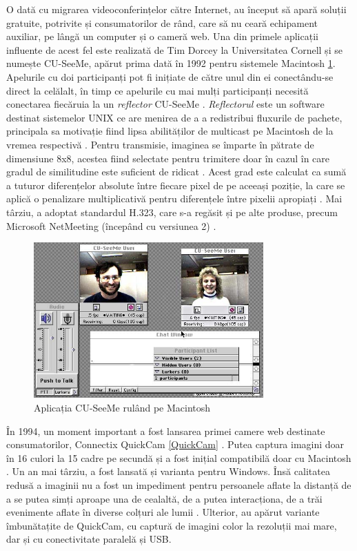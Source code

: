 \indent \par O dată cu migrarea videoconferințelor către Internet, au început să apară soluții gratuite, potrivite și consumatorilor de rând, care să nu ceară echipament auxiliar, pe lângă un computer și o cameră web. Una din primele aplicații influente de acest fel este realizată de Tim Dorcey la Universitatea Cornell și se numește CU-SeeMe, apărut prima dată în 1992 pentru sistemele Macintosh \ref{CUSeeMeMac}. Apelurile cu doi participanți pot fi inițiate de către unul din ei conectându-se direct la celălalt, în timp ce apelurile cu mai mulți participanți necesită conectarea fiecăruia la un \textit{reflector} CU-SeeMe \cite{Dorcey95}. \textit{Reflectorul} este un software destinat sistemelor UNIX ce are menirea de a a redistribui fluxurile de pachete, principala sa motivație fiind lipsa abilităților de multicast pe Macintosh de la vremea respectivă \cite{Dorcey95}. Pentru transmisie, imaginea se împarte în pătrate de dimensiune 8x8, acestea fiind selectate pentru trimitere doar în cazul în care gradul de similitudine este suficient de ridicat \cite{Dorcey95}. Acest grad este calculat ca sumă a tuturor diferențelor absolute între fiecare pixel de pe aceeași poziție, la care se aplică o penalizare multiplicativă pentru diferențele între pixelii apropiați \cite{Dorcey95}. Mai târziu, a adoptat standardul H.323, care s-a regăsit și pe alte produse, precum Microsoft NetMeeting (începând cu versiunea 2) \cite{Vidconf, Perey2000}.
\begin{figure}[H]
    \centering
    \includegraphics[width=8.8cm]{figures/cu-seeme.jpg}
    \caption{Aplicația CU-SeeMe rulând pe Macintosh}
    \label{CUSeeMeMac}
\end{figure}
\indent \par În 1994, un moment important a fost lansarea primei camere web destinate consumatorilor, Connectix QuickCam \ref{QuickCam} \cite{Wolfe2019}. Putea captura imagini doar în 16 culori la 15 cadre pe secundă și a fost inițial compatibilă doar cu Macintosh \cite{Wolfe2019}. Un an mai târziu, a fost lansată și varianta pentru Windows. Însă calitatea redusă a imaginii nu a fost un impediment pentru persoanele aflate la distanță de a se putea simți aproape una de cealaltă, de a putea interacționa, de a trăi evenimente aflate în diverse colțuri ale lumii \cite{QuickCam94}. Ulterior, au apărut variante îmbunătațite de QuickCam, cu captură de imagini color la rezoluții mai mare, dar și cu conectivitate paralelă și USB.
